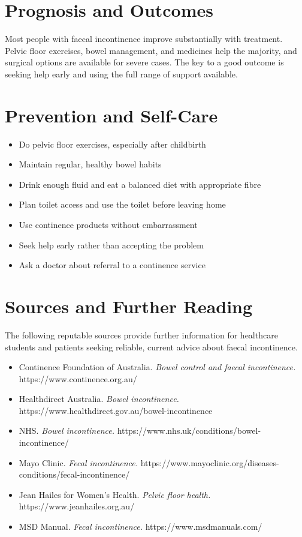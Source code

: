 \section*{Prognosis and Outcomes}
Most people with faecal incontinence improve substantially with treatment. Pelvic floor exercises, bowel management, and medicines help the majority, and surgical options are available for severe cases. The key to a good outcome is seeking help early and using the full range of support available.

\section*{Prevention and Self-Care}
\begin{itemize}
    \item Do pelvic floor exercises, especially after childbirth
    \item Maintain regular, healthy bowel habits
    \item Drink enough fluid and eat a balanced diet with appropriate fibre
    \item Plan toilet access and use the toilet before leaving home
    \item Use continence products without embarrassment
    \item Seek help early rather than accepting the problem
    \item Ask a doctor about referral to a continence service
\end{itemize}

\section*{Sources and Further Reading}
The following reputable sources provide further information for healthcare students and patients seeking reliable, current advice about faecal incontinence.
\begin{itemize}
    \item Continence Foundation of Australia. \textit{Bowel control and faecal incontinence.} https://www.continence.org.au/
    \item Healthdirect Australia. \textit{Bowel incontinence.} https://www.healthdirect.gov.au/bowel-incontinence
    \item NHS. \textit{Bowel incontinence.} https://www.nhs.uk/conditions/bowel-incontinence/
    \item Mayo Clinic. \textit{Fecal incontinence.} https://www.mayoclinic.org/diseases-conditions/fecal-incontinence/
    \item Jean Hailes for Women's Health. \textit{Pelvic floor health.} https://www.jeanhailes.org.au/
    \item MSD Manual. \textit{Fecal incontinence.} https://www.msdmanuals.com/
\end{itemize}

